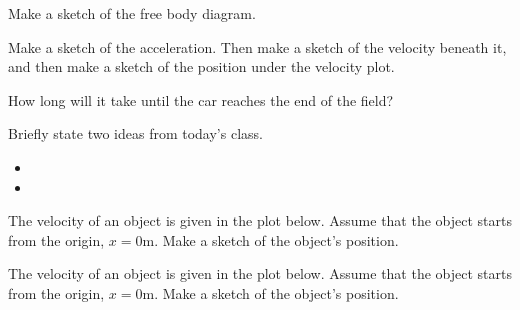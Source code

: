 \begin{problem}
  \begin{subproblem}
  \item Make a sketch of the free body diagram.
    \vspace{5em}
  \item Make a sketch of the acceleration. Then make a sketch of the
    velocity beneath it, and then make a sketch of the position under
    the velocity plot.
    \vfill
  \item How long will it take until the car reaches the end of the
    field?
    \vspace{4em}
  \end{subproblem}

\end{problem}

\postClass

\begin{problem}
\item Briefly state two ideas from today's class.
  \begin{itemize}
  \item 
  \item 
  \end{itemize}
\item 
  \begin{subproblem}
    \item
  \end{subproblem}
\end{problem}



\begin{problem}
\item The velocity of an object is given in the plot
  below. Assume that the object starts from the origin, $x=0$m. Make a
  sketch of the object's position.

  \scalebox{0.7}{}

  \clearpage

\item The velocity of an object is given in the plot
  below. Assume that the object starts from the origin, $x=0$m. Make a
  sketch of the object's position.

  \scalebox{0.7}{}

\end{problem}


